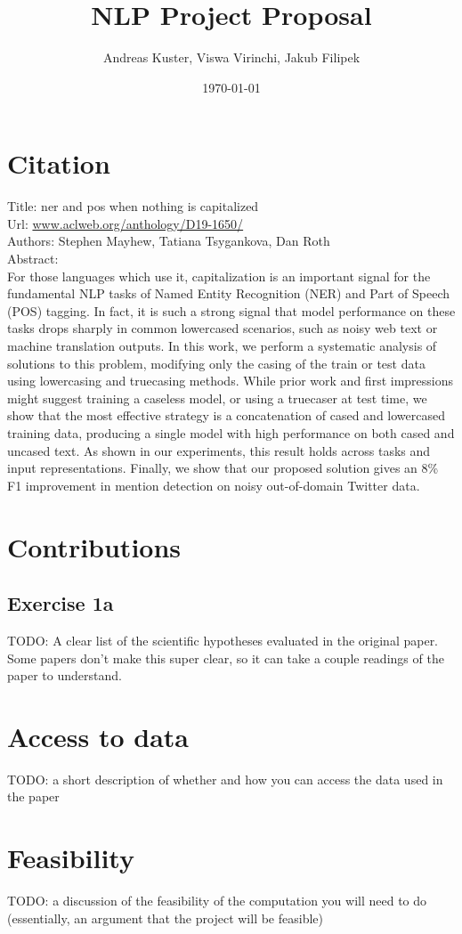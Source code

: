 \documentclass{article}
\title{NLP Project Proposal}
\author{Andreas Kuster, Viswa Virinchi, Jakub Filipek}
\date{\today}
\begin{document}
\maketitle

\section*{Citation}

Title: ner and pos when nothing is capitalized \\

\noindent
Url: \href{https://www.aclweb.org/anthology/D19-1650/}{www.aclweb.org/anthology/D19-1650/} \\

\noindent
Authors: Stephen Mayhew, Tatiana Tsygankova, Dan Roth \\

\noindent
Abstract:  \\
For those languages which use it, capitalization is an important signal for the fundamental NLP tasks of Named Entity Recognition (NER) and Part of Speech (POS) tagging. In fact, it is such a strong signal that model performance on these tasks drops sharply in common lowercased scenarios, such as noisy web text or machine translation outputs. In this work, we perform a systematic analysis of solutions to this problem, modifying only the casing of the train or test data using lowercasing and truecasing methods. While prior work and first impressions might suggest training a caseless model, or using a truecaser at test time, we show that the most effective strategy is a concatenation of cased and lowercased training data, producing a single model with high performance on both cased and uncased text. As shown in our experiments, this result holds across tasks and input representations. Finally, we show that our proposed solution gives an 8\% F1 improvement in mention detection on noisy out-of-domain Twitter data.


\section{Contributions}

\subsection*{Exercise 1a}
TODO: A clear list of the scientific hypotheses evaluated in the original paper. Some papers don't make this super clear, so it can take a couple readings of the paper to understand.


\section{Access to data}
TODO: a short description of whether and how you can access the data used in the paper

\section{Feasibility}
TODO: a discussion of the feasibility of the computation you will need to do (essentially, an argument that the project will be feasible)
\end{document}
